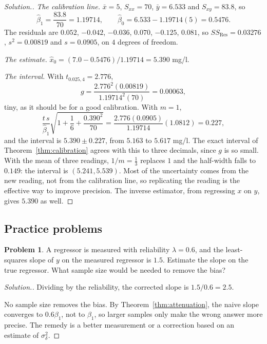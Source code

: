 \documentclass[11pt,a4paper]{article}
\numberwithin{equation}{section}
\theoremstyle{definition}
\newtheorem{problemx}{Problem}[subsection]
\newenvironment{problem}{\begin{problemx}}{\end{problemx}}
\newenvironment{solution}
  {\renewcommand{\qedsymbol}{}\begin{proof}[\textit{Solution}.]}
  {\end{proof}}
\begin{document}
\begin{solution}
\emph{The calibration line.} $\bar x = 5$, $S_{xx} = 70$, $\bar y = 6.533$ and $S_{xy} = 83.8$, so
\[
\hat\beta_1 = \frac{83.8}{70} = 1.19714 , \qquad \hat\beta_0 = 6.533 - 1.19714(5) = 0.5476 .
\]
The residuals are $0.052$, $-0.042$, $-0.036$, $0.070$, $-0.125$, $0.081$, so $SS_{\mathrm{Res}} = 0.03276$, $s^2 = 0.00819$ and $s = 0.0905$, on $4$
degrees of freedom.

\emph{The estimate.} $\hat x_0 = (7.0 - 0.5476)/1.19714 = 5.390$ mg/l.

\emph{The interval.} With $t_{0.025,4} = 2.776$,
\[
g = \frac{2.776^2(0.00819)}{1.19714^2(70)} = 0.00063 ,
\]
tiny, as it should be for a good calibration. With $m = 1$,
\[
\frac{t\,s}{\hat\beta_1}\sqrt{1 + \frac16 + \frac{0.390^2}{70}} = \frac{2.776(0.0905)}{1.19714}(1.0812) = 0.227 ,
\]
and the interval is $5.390 \pm 0.227$, from $5.163$ to $5.617$ mg/l. The exact interval of Theorem~\ref{thm:calibration} agrees with this to three
decimals, since $g$ is so small. With the mean of three readings, $1/m = \frac13$ replaces $1$ and the half-width falls
to $0.149$: the interval is $(5.241, 5.539)$. Most of the uncertainty comes from the new reading, not from the
calibration line, so replicating the reading is the effective way to improve precision. The inverse
estimator, from regressing $x$ on $y$, gives $5.390$ as well.
\end{solution}

\subsection{Practice problems}
\begin{problem}\label{prob:reliability}
A regressor is measured with reliability $\lambda = 0.6$, and the least-squares slope of $y$ on the measured
regressor is $1.5$. Estimate the slope on the true regressor. What sample size would be needed to remove the
bias?
\end{problem}

\begin{solution}
Dividing by the reliability, the corrected slope is $1.5/0.6 = 2.5$.

No sample size removes the bias. By Theorem~\ref{thm:attenuation}, the naive slope converges to $0.6\beta_1$, not
to $\beta_1$, so larger samples only make the wrong answer more precise. The remedy is a better
measurement or a correction based on an estimate of $\sigma_\delta^2$.
\end{solution}
\end{document}
